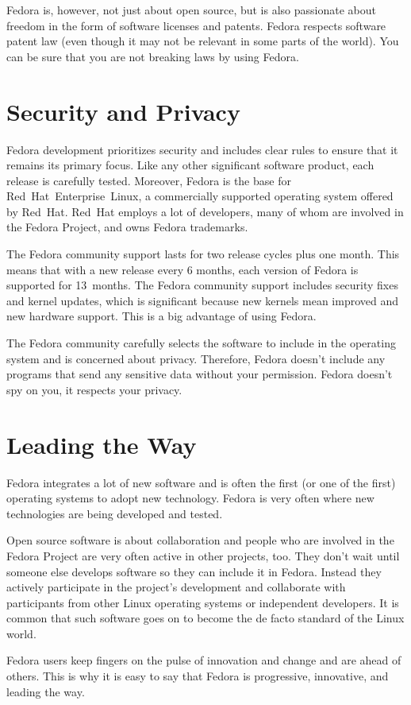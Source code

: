 Fedora is, however, not just about open source, but is also passionate about freedom in the form of software licenses and patents. Fedora respects software patent law (even though it may not be relevant in some parts of the world). You can be sure that you are not breaking laws by using Fedora.

\section*{Security and Privacy}

Fedora development prioritizes security and includes clear rules to ensure that it remains its primary focus. Like any other significant software product, each release is carefully tested. Moreover, Fedora is the base for Red~Hat~Enterprise~Linux, a commercially supported operating system offered by Red~Hat. Red~Hat employs a lot of developers, many of whom are involved in the Fedora Project, and owns Fedora trademarks.

The Fedora community support lasts for two release cycles plus one month. This means that with a new release every 6 months, each version of Fedora is supported for 13~months. The Fedora community support includes security fixes and kernel updates, which is significant because new kernels mean improved and new hardware support. This is a big advantage of using Fedora.

The Fedora community carefully selects the software to include in the operating system and is concerned about privacy. Therefore, Fedora doesn't include any programs that send any sensitive data without your permission. Fedora doesn't spy on you, it respects your privacy.

\section*{Leading the Way}

Fedora integrates a lot of new software and is often the first (or one of the first) operating systems to adopt new technology. Fedora is very often where new technologies are being developed and tested.

Open source software is about collaboration and people who are involved in the Fedora Project are very often active in other projects, too. They don't wait until someone else develops software so they can include it in Fedora. Instead they actively participate in the project's development and collaborate with participants from other Linux operating systems or independent developers. It is common that such software goes on to become the de facto standard of the Linux world.

Fedora users keep fingers on the pulse of innovation and change and are ahead of others. This is why it is easy to say that Fedora is progressive, innovative, and leading the way.
